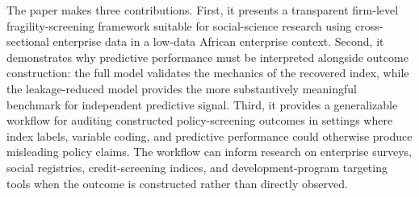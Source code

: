 The paper makes three contributions. First, it presents a transparent firm-level fragility-screening framework suitable for social-science research using cross-sectional enterprise data in a low-data African enterprise context. Second, it demonstrates why predictive performance must be interpreted alongside outcome construction: the full model validates the mechanics of the recovered index, while the leakage-reduced model provides the more substantively meaningful benchmark for independent predictive signal. Third, it provides a generalizable workflow for auditing constructed policy-screening outcomes in settings where index labels, variable coding, and predictive performance could otherwise produce misleading policy claims. The workflow can inform research on enterprise surveys, social registries, credit-screening indices, and development-program targeting tools when the outcome is constructed rather than directly observed.
